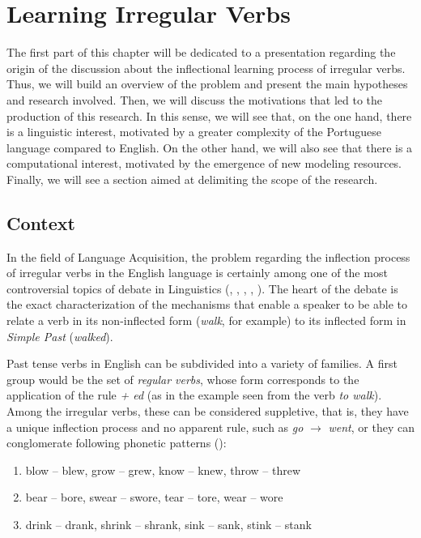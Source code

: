 \chapter{Learning Irregular Verbs}
\label{ch:01}

The first part of this chapter will be dedicated to a presentation regarding the origin of the discussion about the inflectional learning process of irregular verbs. Thus, we will build an overview of the problem and present the main hypotheses and research involved. Then, we will discuss the motivations that led to the production of this research. In this sense, we will see that, on the one hand, there is a linguistic interest, motivated by a greater complexity of the Portuguese language compared to English. On the other hand, we will also see that there is a computational interest, motivated by the emergence of new modeling resources. Finally, we will see a section aimed at delimiting the scope of the research.

\section{Context}
In the field of Language Acquisition, the problem regarding the inflection process of irregular verbs in the English language is certainly among one of the most controversial topics of debate in Linguistics (\cite{chomsky:1968}, \cite{Pinker:1999}, \cite{Pinker:1988}, \cite{Albright2003RulesVA}, \cite{kirov:2018}). The heart of the debate is the exact characterization of the mechanisms that enable a speaker to be able to relate a verb in its non-inflected form (\textit{walk}, for example) to its inflected form in \textit{Simple Past} (\textit{walked}).

Past tense verbs in English can be subdivided into a variety of families. A first group would be the set of \textit{regular verbs}, whose form corresponds to the application of the rule \textit{ + ed} (as in the example seen from the verb \textit{to walk}).
Among the irregular verbs, these can be considered suppletive, that is, they have a unique inflection process and no apparent rule, such as \textit{go} $ \rightarrow $ \textit{went}, or they can conglomerate following phonetic patterns (\cite{Nelson:2010}):

\begin{enumerate}
    \item blow – blew, grow – grew, know – knew, throw – threw
    \item bear – bore, swear – swore, tear – tore, wear – wore
    \item drink – drank, shrink – shrank, sink – sank, stink – stank 
\end{enumerate}

